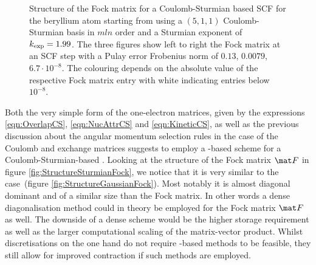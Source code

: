 \begin{figure}
	\centering
	\caption[Structure of the Fock matrix for a Coulomb-Sturmian based SCF]
		{Structure of the Fock matrix for a Coulomb-Sturmian based SCF
		for the beryllium atom starting from using a $(5,1,1)$
		Coulomb-Sturmian basis in $mln$ order
		and a Sturmian exponent of $k_\text{exp} = 1.99$.
		The three figures show left to right the Fock matrix
		at an SCF step with a Pulay error Frobenius norm of
		$0.13$, $0.0079$, $6.7 \cdot 10^{-8}$.
		The colouring depends on the absolute value
		of the respective Fock matrix entry
		with white indicating entries below $10^{-8}$.
		}
	\label{fig:StructureSturmianFock}
\end{figure}
Both the very simple form of the one-electron matrices,
given by the expressions
\eqref{eqn:OverlapCS},
\eqref{eqn:NucAttrCS} and
\eqref{eqn:KineticCS},
as well as the previous discussion about the angular momentum selection
rules in the case of the Coulomb and exchange matrices
suggests to employ a \contraction-based scheme
for a Coulomb-Sturmian-based \SCF.
Looking at the structure of the Fock matrix $\matF$
in figure \vref{fig:StructureSturmianFock},
we notice that it is very similar to the \cGTO case~(figure \vref{fig:StructureGaussianFock}).
Most notably it is almost diagonal dominant and of a similar
size than the \cGTO Fock matrix.
In other words a dense diagonalisation method could in theory be employed
for the Fock matrix $\matF$ as well.
The downside of a dense scheme would be the higher
storage requirement as well as the larger
computational scaling of the matrix-vector product.
Whilst \CS discretisations on the one hand
do not require \contraction-based methods to be feasible,
they still allow for improved contraction if such methods are employed.

